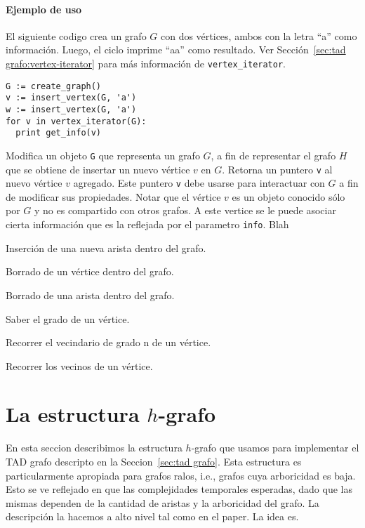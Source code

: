 \documentclass[a4paper,12pt]{article}
\begin{document}
\paragraph{Ejemplo de uso}

El siguiente codigo crea un grafo $G$ con dos vértices, ambos con la letra ``a'' como información.  Luego, el ciclo imprime ``aa'' como resultado.  Ver Sección~\ref{sec:tad grafo:vertex-iterator} para más información de \texttt{vertex\_iterator}.

\begin{lstlisting}
G := create_graph()
v := insert_vertex(G, 'a')
w := insert_vertex(G, 'a')
for v in vertex_iterator(G):
  print get_info(v)
\end{lstlisting}


\begin{description}
  \item [\texttt{insert\_vertex(G, info)}.]  Modifica un objeto \texttt{G} que representa un grafo $G$, a fin de representar el grafo $H$ que se obtiene de insertar un nuevo vértice $v$ en $G$.  Retorna un puntero \texttt{v} al nuevo vértice $v$ agregado.  Este puntero \texttt{v} debe usarse para interactuar con $G$ a fin de modificar sus propiedades.  Notar que el vértice $v$ es un objeto conocido sólo por $G$ y no es compartido con otros grafos.  A este vertice se le puede asociar cierta información que es la reflejada por el parametro \texttt{info}.  Blah
  
  
  
  \item Inserción de una nueva arista dentro del grafo.
  \item Borrado de un vértice dentro del grafo.
  \item Borrado de una arista dentro del grafo.
  \item Saber el grado de un vértice.
  \item Recorrer el vecindario de grado n de un vértice.
  \item Recorrer los vecinos de un vértice.
\end{description}



\section{La estructura $h$-grafo}
\label{sec:h-grafo}

En esta seccion describimos la estructura $h$-grafo que usamos para implementar el TAD grafo descripto en la Seccion~\ref{sec:tad grafo}.  Esta estructura es particularmente apropiada para grafos ralos, i.e., grafos cuya arboricidad es baja.  Esto se ve reflejado en que las complejidades temporales esperadas, dado que las mismas dependen de la cantidad de aristas y la arboricidad del grafo.  La descripción la hacemos a alto nivel tal como en el paper.  La idea es.
\end{document}
